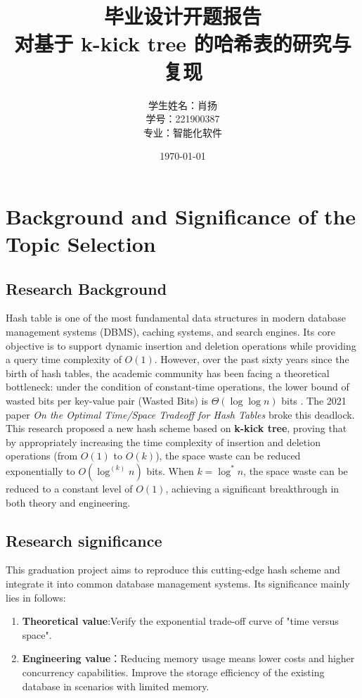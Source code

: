 \documentclass[a4paper,12pt]{ctexart}
\title{\textbf{毕业设计开题报告}\\[1em]
\Large 对基于 k-kick tree 的哈希表的研究与复现}
\author{学生姓名：肖扬 \\ 
        学号：221900387 \\ 
        专业：智能化软件}
\date{\today}
\begin{document}
\maketitle

\newpage
\tableofcontents
\newpage


\section{Background and Significance of the Topic Selection}

\subsection{Research Background}
Hash table is one of the most fundamental data structures in modern database management systems (DBMS), caching systems, and search engines. Its core objective is to support dynamic insertion and deletion operations while providing a query time complexity of $O(1)$. However, over the past sixty years since the birth of hash tables, the academic community has been facing a theoretical bottleneck: under the condition of constant-time operations, the lower bound of wasted bits per key-value pair (Wasted Bits) is $\Theta(\log \log n)$ bits \cite{pagh2001low}. 
The 2021 paper \textit{On the Optimal Time/Space Tradeoff for Hash Tables} \cite{bender2021optimal} broke this deadlock. This research proposed a new hash scheme based on \textbf{k-kick tree}, proving that by appropriately increasing the time complexity of insertion and deletion operations (from $O(1)$ to $O(k)$), the space waste can be reduced exponentially to $O(\log^{(k)} n)$ bits. When $k=\log^* n$, the space waste can be reduced to a constant level of $O(1)$, achieving a significant breakthrough in both theory and engineering.

\subsection{Research significance}
This graduation project aims to reproduce this cutting-edge hash scheme and integrate it into common database management systems. Its significance mainly lies in follows:
\begin{enumerate}
    \item \textbf{Theoretical value}:Verify the exponential trade-off curve of "time versus space".
    \item \textbf{Engineering value}：Reducing memory usage means lower costs and higher concurrency capabilities. Improve the storage efficiency of the existing database in scenarios with limited memory.
\end{enumerate}
\end{document}
